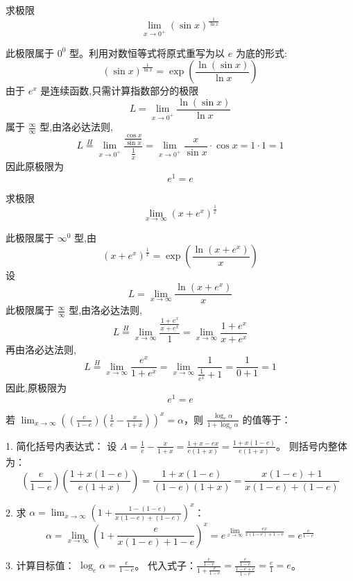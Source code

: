 \begin{questions}
    \question 求极限
    \[
    \lim_{x \to 0^+} (\sin x)^{\frac{1}{\ln x}}
    \]
    \begin{solution}
        此极限属于 $0^0$ 型。利用对数恒等式将原式重写为以 $e$ 为底的形式:
        \[
        (\sin x)^{\frac{1}{\ln x}} = \exp\left( \frac{\ln(\sin x)}{\ln x} \right)
        \]
        由于 $e^x$ 是连续函数,只需计算指数部分的极限
        \[
        L = \lim_{x \to 0^+} \frac{\ln(\sin x)}{\ln x}
        \]
        属于 $\frac{\infty}{\infty}$ 型,由洛必达法则,
        \[
        L \overset{H}{=} \lim_{x \to 0^+} \frac{\frac{\cos x}{\sin x}}{\frac{1}{x}} =  \lim_{x \to 0^+} \frac{x}{\sin x} \cdot \cos x  = 1 \cdot 1 = 1
        \]
        因此原极限为
        \[
        e^1 = e
        \]
    \end{solution}

    \question 求极限
    \[
    \lim_{x \to \infty} (x + e^x)^{\frac{1}{x}}
    \]
    \begin{solution}
        此极限属于 $\infty^0$ 型,由
        \[
        (x + e^x)^{\frac{1}{x}} = \exp\left( \frac{\ln(x + e^x)}{x} \right)
        \]
        设
        \[
        L = \lim_{x \to \infty} \frac{\ln(x + e^x)}{x}
        \]
        此极限属于 $\frac{\infty}{\infty}$ 型,由洛必达法则,
        \[
        L \overset{H}{=} \lim_{x \to \infty} \frac{\frac{1 + e^x}{x + e^x}}{1} = \lim_{x \to \infty} \frac{1 + e^x}{x + e^x}
        \]
        再由洛必达法则,
        \[
        L \overset{H}{=} \lim_{x \to \infty} \frac{e^x}{1 + e^x} = \lim_{x \to \infty} \frac{1}{\frac{1}{e^x} + 1} = \frac{1}{0 + 1} = 1
        \]
        因此,原极限为
        \[
        e^1 = e
        \]
    \end{solution}
\question 
若 $\lim_{x \to \infty} \left( \left( \frac{e}{1-e} \right) \left( \frac{1}{e} - \frac{x}{1+x} \right) \right)^x = \alpha$，则 $\frac{\log_e \alpha}{1 + \log_e \alpha}$ 的值等于：

\begin{solution}
1. 简化括号内表达式：
设 $A = \frac{1}{e} - \frac{x}{1+x} = \frac{1+x-ex}{e(1+x)} = \frac{1+x(1-e)}{e(1+x)}$。
则括号内整体为：
\[ \left( \frac{e}{1-e} \right) \left( \frac{1+x(1-e)}{e(1+x)} \right) = \frac{1+x(1-e)}{(1-e)(1+x)} = \frac{x(1-e)+1}{x(1-e)+(1-e)} \]

2. 求 $\alpha = \lim_{x \to \infty} \left( 1 + \frac{1-(1-e)}{x(1-e)+(1-e)} \right)^x$：
\[ \alpha = \lim_{x \to \infty} \left( 1 + \frac{e}{x(1-e)+1-e} \right)^x = e^{\lim_{x \to \infty} \frac{ex}{x(1-e)+1-e}} = e^{\frac{e}{1-e}} \]

3. 计算目标值：
$\log_e \alpha = \frac{e}{1-e}$。
代入式子：$\frac{\frac{e}{1-e}}{1 + \frac{e}{1-e}} = \frac{\frac{e}{1-e}}{\frac{1-e+e}{1-e}} = \frac{e}{1} = e$。


\end{solution}
\end{questions}
